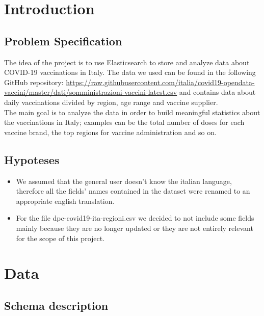 \documentclass[12pt, a4paper]{article}
\begin{document}
\listoftodos

\clearpage

\setlength{\parskip}{\baselineskip}%
\setlength{\parindent}{0pt}%

\section{Introduction}

\subsection{Problem Specification}

The idea of the project is to use Elasticsearch to store and analyze data about 
COVID-19 vaccinations in Italy. The data we used can be found in the following 
GitHub repository: \url{https://raw.githubusercontent.com/italia/covid19-opendata-vaccini/master/dati/somministrazioni-vaccini-latest.csv}
and contains data about daily vaccinations divided by region, age range and vaccine
supplier. \\ 
The main goal is to analyze the data in order to build meaningful statistics 
about the vaccinations in Italy; examples can be the total number of doses for each 
vaccine brand, the top regions for vaccine administration and so on.

\subsection{Hypoteses}

\begin{itemize}
  \item[] We assumed that the general user doesn't know the italian language, therefore
    all the fields' names contained in the dataset were renamed to an appropriate 
    english translation. 
  \item[] For the file dpc-covid19-ita-regioni.csv we decided to not include some fields
    mainly because they are no longer updated or they are not entirely relevant for the
    scope of this project.
\end{itemize}
  
\clearpage

\section{Data }

\subsection{Schema description}
\end{document}
